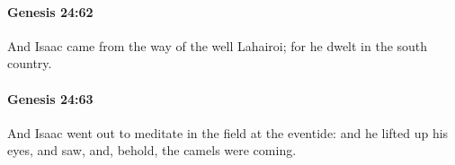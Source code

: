 		\paragraph{Genesis 24:62} %
			\label{GENESIS-24-62}

			And Isaac came from the way of the well Lahairoi; for he dwelt in the south country.


		\paragraph{Genesis 24:63} %
			\label{GENESIS-24-63}

			And Isaac went out to meditate in the field at the eventide: and he lifted up his eyes, and saw, and, behold, the camels were coming.


